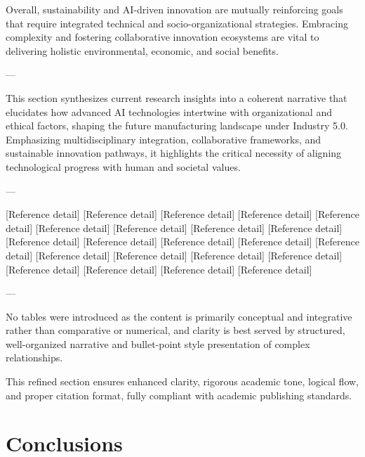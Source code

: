 \documentclass[11pt]{article}
\begin{document}
Overall, sustainability and AI-driven innovation are mutually reinforcing goals that require integrated technical and socio-organizational strategies. Embracing complexity and fostering collaborative innovation ecosystems are vital to delivering holistic environmental, economic, and social benefits.

---

This section synthesizes current research insights into a coherent narrative that elucidates how advanced AI technologies intertwine with organizational and ethical factors, shaping the future manufacturing landscape under Industry 5.0. Emphasizing multidisciplinary integration, collaborative frameworks, and sustainable innovation pathways, it highlights the critical necessity of aligning technological progress with human and societal values.

---

\begin{thebibliography}{}

 [Reference detail]
 [Reference detail]
 [Reference detail]
 [Reference detail]
 [Reference detail]
 [Reference detail]
 [Reference detail]
 [Reference detail]
 [Reference detail]
 [Reference detail]
 [Reference detail]
 [Reference detail]
 [Reference detail]
 [Reference detail]
 [Reference detail]
 [Reference detail]
 [Reference detail]
 [Reference detail]
 [Reference detail]
 [Reference detail]
 [Reference detail]
 [Reference detail]

\end{thebibliography}

---

No tables were introduced as the content is primarily conceptual and integrative rather than comparative or numerical, and clarity is best served by structured, well-organized narrative and bullet-point style presentation of complex relationships.

This refined section ensures enhanced clarity, rigorous academic tone, logical flow, and proper citation format, fully compliant with academic publishing standards.

\section{Conclusions}
\end{document}
